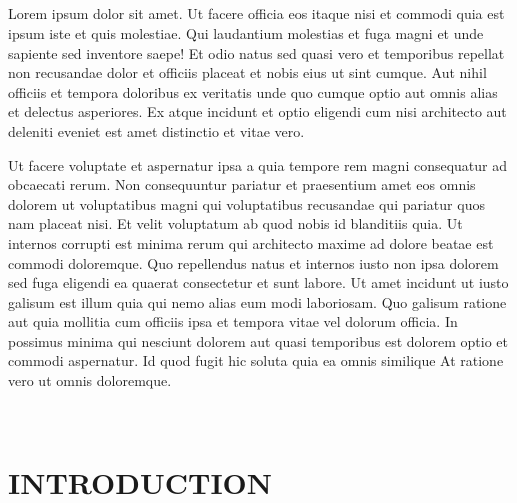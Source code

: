 \documentclass[a4paper,12pt]{report}
\begin{document}
\paragraph{}
\par Lorem ipsum dolor sit amet. Ut facere officia eos itaque nisi et commodi quia est ipsum iste et quis molestiae. Qui laudantium molestias et fuga magni et unde sapiente sed inventore saepe! Et odio natus sed quasi vero et temporibus repellat non recusandae dolor et officiis placeat et nobis eius ut sint cumque. Aut nihil officiis et tempora doloribus ex veritatis unde quo cumque optio aut omnis alias et delectus asperiores. Ex atque incidunt et optio eligendi cum nisi architecto aut deleniti eveniet est amet distinctio et vitae vero. 
\par Ut facere voluptate et aspernatur ipsa a quia tempore rem magni consequatur ad obcaecati rerum. Non consequuntur pariatur et praesentium amet eos omnis dolorem ut voluptatibus magni qui voluptatibus recusandae qui pariatur quos nam placeat nisi. Et velit voluptatum ab quod nobis id blanditiis quia. Ut internos corrupti est minima rerum qui architecto maxime ad dolore beatae est commodi doloremque. Quo repellendus natus et internos iusto non ipsa dolorem sed fuga eligendi ea quaerat consectetur et sunt labore. Ut amet incidunt ut iusto galisum est illum quia qui nemo alias eum modi laboriosam. Quo galisum ratione aut quia mollitia cum officiis ipsa et tempora vitae vel dolorum officia. In possimus minima qui nesciunt dolorem aut quasi temporibus est dolorem optio et commodi aspernatur. Id quod fugit hic soluta quia ea omnis similique At ratione vero ut omnis doloremque.



\setcounter{page}{1}
\setcounter{tocdepth}{1}
\renewcommand\contentsname{CONTENTS}
\tableofcontents
\listoffigures
 



\renewcommand\chaptername{CHAPTER}
\newpage
\chapter{INTRODUCTION}
\end{document}
